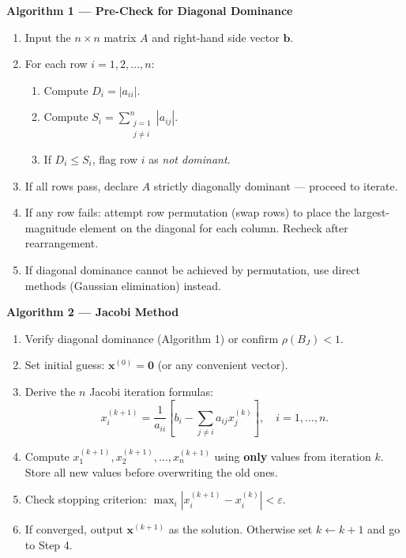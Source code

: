 \documentclass[12pt,a4paper]{article}
\begin{document}
\textbf{Algorithm 1 --- Pre-Check for Diagonal Dominance}

\begin{enumerate}
  \item Input the \(n \times n\) matrix \(A\) and right-hand side vector \(\mathbf{b}\).
  \item For each row \(i = 1, 2, \ldots, n\):
    \begin{enumerate}[label=\alph*.]
      \item Compute \(D_i = |a_{ii}|\).
      \item Compute \(S_i = \displaystyle\sum_{\substack{j=1\\j\neq i}}^{n}|a_{ij}|\).
      \item If \(D_i \leq S_i\), flag row \(i\) as \emph{not dominant}.
    \end{enumerate}
  \item If all rows pass, declare \(A\) strictly diagonally dominant --- proceed to iterate.
  \item If any row fails: attempt row permutation (swap rows) to place the largest-magnitude
        element on the diagonal for each column. Recheck after rearrangement.
  \item If diagonal dominance cannot be achieved by permutation, use direct methods
        (Gaussian elimination) instead.
\end{enumerate}

\textbf{Algorithm 2 --- Jacobi Method}

\begin{enumerate}
  \item Verify diagonal dominance (Algorithm 1) or confirm \(\rho(B_J) < 1\).
  \item Set initial guess: \(\mathbf{x}^{(0)} = \mathbf{0}\) (or any convenient vector).
  \item Derive the \(n\) Jacobi iteration formulas:
    \[
      x_i^{(k+1)} = \frac{1}{a_{ii}}\!\left[b_i - \sum_{j\neq i}a_{ij}x_j^{(k)}\right],
      \quad i = 1, \ldots, n.
    \]
  \item Compute \(x_1^{(k+1)}, x_2^{(k+1)}, \ldots, x_n^{(k+1)}\)
        using \textbf{only} values from iteration \(k\).
        Store all new values before overwriting the old ones.
  \item Check stopping criterion: \(\max_i|x_i^{(k+1)}-x_i^{(k)}| < \varepsilon\).
  \item If converged, output \(\mathbf{x}^{(k+1)}\) as the solution.
        Otherwise set \(k \leftarrow k+1\) and go to Step 4.
\end{enumerate}
\end{document}
